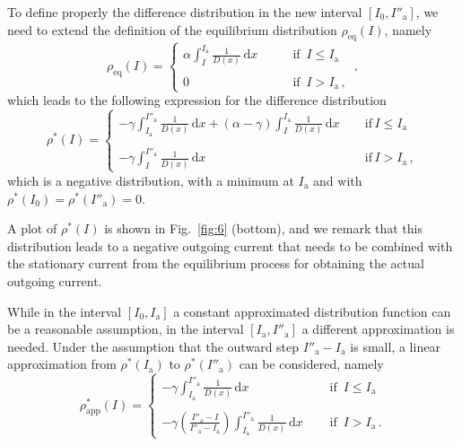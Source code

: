 To define properly the difference distribution in the new interval $[I_0, I''_\mathrm{a}]$, we need to extend the definition of the equilibrium distribution $\rho_\text{eq}(I)$, namely
\begin{equation}
    \rho_\text{eq}(I) = 
    \left\{\begin{array}{lr}
        \alpha \displaystyle{\int_I^{I_\mathrm{a}} \frac{1}{D(x)}\,\mathrm{d}x} \qquad & \text{if } \, I \leq I_\mathrm{a} \\
        \\
        0 \qquad & \text{if } \, I > I_\mathrm{a}\,,
    \end{array}\right.\,,
\end{equation}
which leads to the following expression for the difference distribution  
\begin{equation}
    \rho^\ast(I) = 
    \left\{\begin{array}{lr}
        - \gamma \displaystyle{\int_{I_\mathrm{a}}^{I''_\mathrm{a}} \frac{1}{D(x)}\,\mathrm{d}x + (\alpha - \gamma) \int_{I}^{I_\mathrm{a}} \frac{1}{D(x)}\,\mathrm{d}x}\ \quad &\text{if} \, I \leq I_\mathrm{a}\\
        \\
        - \gamma \displaystyle{\int_{I}^{I''_\mathrm{a}} \frac{1}{D(x)}\,\mathrm{d}x} \quad &\text{if} \, I > I_\mathrm{a}\,,
    \end{array}\right. 
    \label{eq:outward_difference}
\end{equation}
which is a negative distribution, with a minimum at $I_\mathrm{a}$ and with $\rho^\ast(I_0) = \rho^\ast(I''_\mathrm{a}) = 0$.

A plot of $\rho^\ast(I)$ is shown in Fig.~\ref{fig:6} (bottom), and we remark that this distribution leads to a negative outgoing current that needs to be combined with the stationary current from the equilibrium process for obtaining the actual outgoing current.

While in the interval $[I_0, I_\mathrm{a}]$ a constant approximated distribution function can be a reasonable assumption, in the interval $[I_\mathrm{a}, I''_\mathrm{a}]$ a different approximation is needed. Under the assumption that the outward step $I''_\mathrm{a} - I_\mathrm{a}$ is small, a linear approximation from $\rho^\ast(I_\mathrm{a})$ to $\rho^\ast(I''_\mathrm{a})$ can be considered, namely
\begin{equation}
    \rho^\ast_\text{app}(I) = 
    \left\{\begin{array}{lr}
        - \gamma \displaystyle{\int_{I_\mathrm{a}}^{I''_\mathrm{a}} \frac{1}{D(x)}\,\mathrm{d}x} \quad &\text{  if } \, I \leq I_\mathrm{a}\\
        \\
        - \gamma \displaystyle{\left(\frac{I''_\mathrm{a} - I}{I''_\mathrm{a} - I_\mathrm{a}} \right)} \displaystyle{\int_{I_\mathrm{a}}^{I''_\mathrm{a}} \frac{1}{D(x)}\,\mathrm{d}x} \quad &\text{  if } \, I > I_\mathrm{a} \,.
    \end{array}\right. 
    \label{eq:outward_difference_approx}
\end{equation} 


